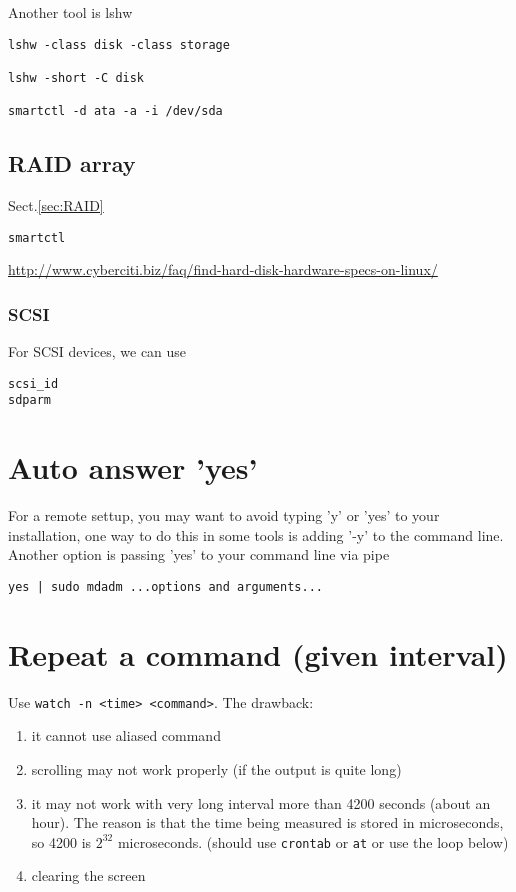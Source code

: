 Another tool is lshw
\begin{verbatim}
lshw -class disk -class storage
 
lshw -short -C disk

smartctl -d ata -a -i /dev/sda
\end{verbatim}

\subsection{RAID array}


Sect.\ref{sec:RAID}

\begin{verbatim}
smartctl
\end{verbatim}
\url{http://www.cyberciti.biz/faq/find-hard-disk-hardware-specs-on-linux/}

\subsubsection{SCSI}

For SCSI devices, we can use
\begin{verbatim}
scsi_id
sdparm
\end{verbatim}

\section{Auto answer 'yes'}

For a remote settup, you may want to avoid typing 'y' or 'yes' to your
installation, one way to do this in some tools is adding '-y' to the command
line. Another option is passing 'yes' to your command line via pipe
\begin{verbatim}
yes | sudo mdadm ...options and arguments...
\end{verbatim}

\section{Repeat a command (given interval)}

Use \verb!watch -n <time> <command>!. The drawback: 
\begin{enumerate}
  \item  it cannot use aliased command
  \item scrolling may not work properly (if the output is quite long)
  \item it may not work with very long interval more than 4200 seconds
  (about an hour). The reason is that
  the time being measured is stored in microseconds, so 4200 is $2^{32}$
  microseconds. (should use \verb!crontab! or \verb!at! or use the loop below)
  \item clearing the screen 
\end{enumerate}

